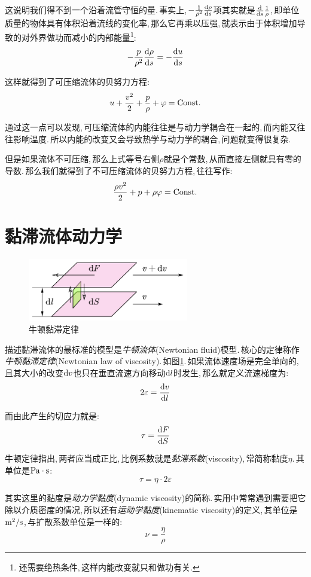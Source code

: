 这说明我们得不到一个沿着流管守恒的量.\,事实上,\,$-\frac{1}{\rho^2}\frac{\textrm{d} \rho}{\textrm{d} s}$项其实就是$\frac{\textrm{d} }{\textrm{d} s}\frac{1}{\rho}$,\,即单位质量的物体具有体积沿着流线的变化率,\,那么它再乘以压强,\,就表示由于体积增加导致的对外界做功而减小的内部能量\footnote{还需要绝热条件,\,这样内能改变就只和做功有关.}:
\[-\frac{p}{\rho^2}\frac{\textrm{d} \rho}{\textrm{d} s}=-\frac{\textrm{d} u}{\textrm{d} s}\]

这样就得到了可压缩流体的贝努力方程:
\[u+\frac{v^2}{2}+\frac{p}{\rho}+\varphi={\rm Const.}\]

通过这一点可以发现,\,可压缩流体的内能往往是与动力学耦合在一起的,\,而内能又往往影响温度.\,所以内能的改变又会导致热学与动力学的耦合,\,问题就变得很复杂.

但是如果流体不可压缩,\,那么上式等号右侧$\rho$就是个常数,\,从而直接左侧就具有零的导数.\,那么我们就得到了不可压缩流体的贝努力方程,\,往往写作:
\[\frac{\rho v^2}{2}+p+\rho\varphi={\rm Const.}\]

\section{黏滞流体动力学}

\begin{figure}
\vspace{-0.1cm}
\centering
\includegraphics[width=7cm]{image/6-8-3.png}
\caption{牛顿黏滞定律}\label{6-8-3}
\end{figure}
描述黏滞流体的最标准的模型是\emph{牛顿流体}(Newtonian fluid)模型.\,核心的定律称作\emph{牛顿黏滞定律}(Newtonian law of viscosity).\,如图\ref{6-8-3}.\,如果流体速度场是完全单向的,\,且其大小的改变$\textrm{d} v$也只在垂直流速方向移动$\textrm{d} l$时发生,\,那么就定义流速梯度为:
\[2\varepsilon=\frac{\textrm{d} v}{\textrm{d} l}\]

而由此产生的切应力就是:
\[\tau=\frac{\textrm{d} F}{\textrm{d} S}\]

牛顿定律指出,\,两者应当成正比,\,比例系数就是\emph{黏滞系数}(viscosity),\,常简称黏度$\eta$.\,其单位是${\rm Pa\cdot s}$:
\[\tau=\eta\cdot 2\varepsilon\]

其实这里的黏度是\emph{动力学黏度}(dynamic viscosity)的简称.\,实用中常常遇到需要把它除以介质密度的情况,\,所以还有\emph{运动学黏度}(kinematic viscosity)的定义,\,其单位是${\rm m^2/s}$,\,与扩散系数单位是一样的:
\[\nu=\frac{\eta}{\rho}\]

